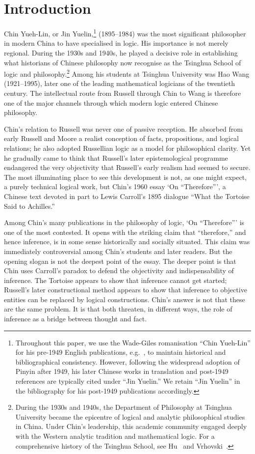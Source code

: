 \documentclass{birkjour}
\begin{document}
\section{Introduction}

Chin Yueh-Lin, or Jin Yuelin,\footnote{Throughout this paper, we use the Wade-Giles romanisation ``Chin Yueh-Lin'' for his pre-1949 English publications, e.g.~\cite{Chin1934}, to maintain historical and bibliographical consistency. However, following the widespread adoption of Pinyin after 1949, his later Chinese works in translation and post-1949 references are typically cited under ``Jin Yuelin.'' We retain ``Jin Yuelin'' in the bibliography for his post-1949 publications accordingly.} (1895--1984) was the most significant philosopher in modern China to have specialised in logic. His importance is not merely regional. During the 1930s and 1940s, he played a decisive role in establishing what historians of Chinese philosophy now recognise as the Tsinghua School of logic and philosophy.\footnote{During the 1930s and 1940s, the Department of Philosophy at Tsinghua University became the epicentre of logical and analytic philosophical studies in China. Under Chin's leadership, this academic community engaged deeply with the Western analytic tradition and mathematical logic. For a comprehensive history of the Tsinghua School, see Hu~\cite{Hu2005} and Vrhovski~\cite{vrhovski2021qinghua}.} Among his students at Tsinghua University was Hao Wang (1921--1995), later one of the leading mathematical logicians of the twentieth century. The intellectual route from Russell through Chin to Wang is therefore one of the major channels through which modern logic entered Chinese philosophy.

Chin's relation to Russell was never one of passive reception. He absorbed from early Russell and Moore a realist conception of facts, propositions, and logical relations; he also adopted Russellian logic as a model for philosophical clarity. Yet he gradually came to think that Russell's later epistemological programme endangered the very objectivity that Russell's early realism had seemed to secure. The most illuminating place to see this development is not, as one might expect, a purely technical logical work, but Chin's 1960 essay `On ``Therefore''', a Chinese text devoted in part to Lewis Carroll's 1895 dialogue ``What the Tortoise Said to Achilles.''

Among Chin's many publications in the philosophy of logic, `On ``Therefore''' is one of the most contested. It opens with the striking claim that ``therefore,'' and hence inference, is in some sense historically and socially situated. This claim was immediately controversial among Chin's students and later readers. But the opening slogan is not the deepest point of the essay. The deeper point is that Chin uses Carroll's paradox to defend the objectivity and indispensability of inference. The Tortoise appears to show that inference cannot get started; Russell's later constructional method appears to show that inference to objective entities can be replaced by logical constructions. Chin's answer is not that these are the same problem. It is that both threaten, in different ways, the role of inference as a bridge between thought and fact.
\end{document}
